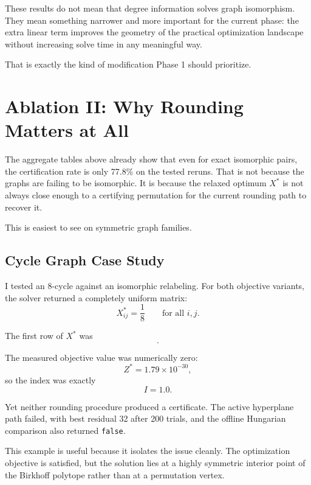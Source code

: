 \documentclass[11pt]{article}
\begin{document}
These results do not mean that degree information solves graph isomorphism.
They mean something narrower and more important for the current phase:
the extra linear term improves the geometry of the practical optimization landscape without increasing solve time in any meaningful way.

That is exactly the kind of modification Phase 1 should prioritize.

\section{Ablation II: Why Rounding Matters at All}

The aggregate tables above already show that even for exact isomorphic pairs,
the certification rate is only 77.8\% on the tested reruns.
That is not because the graphs are failing to be isomorphic.
It is because the relaxed optimum $X^*$ is not always close enough to a certifying permutation for the current rounding path to recover it.

This is easiest to see on symmetric graph families.

\subsection{Cycle Graph Case Study}

I tested an 8-cycle against an isomorphic relabeling.
For both objective variants, the solver returned a completely uniform matrix:
\begin{equation}
X^*_{ij} = \frac{1}{8} \qquad \text{for all } i,j.
\end{equation}

The first row of $X^*$ was
\begin{equation}
[0.125, 0.125, 0.125, 0.125, 0.125, 0.125, 0.125, 0.125].
\end{equation}

The measured objective value was numerically zero:
\begin{equation}
Z^* = 1.79 \times 10^{-30},
\end{equation}
so the index was exactly
\begin{equation}
I = 1.0.
\end{equation}

Yet neither rounding procedure produced a certificate.
The active hyperplane path failed, with best residual 32 after 200 trials,
and the offline Hungarian comparison also returned \texttt{false}.

This example is useful because it isolates the issue cleanly.
The optimization objective is satisfied,
but the solution lies at a highly symmetric interior point of the Birkhoff polytope rather than at a permutation vertex.
\end{document}
